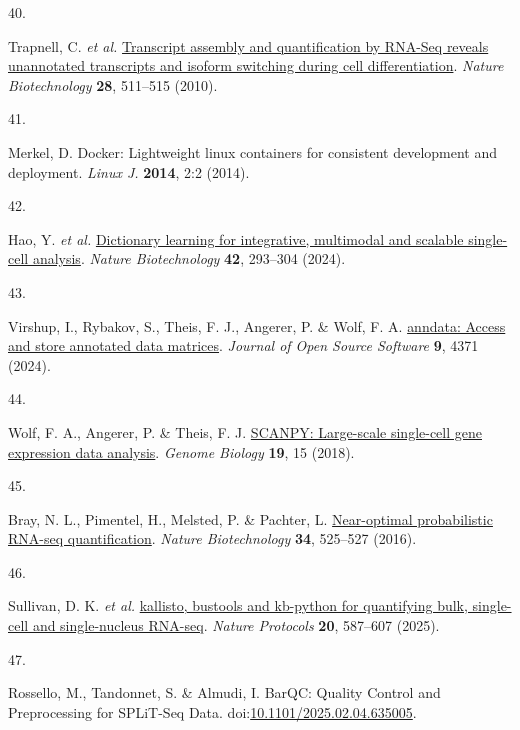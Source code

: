 \documentclass[
  11pt,
  a4paper,
]{report}
\newlength{\cslhangindent}
\newlength{\csllabelwidth}
\newenvironment{CSLReferences}[2] %
 {\begin{list}{}{%
  \setlength{\itemindent}{0pt}
  \setlength{\leftmargin}{0pt}
  \setlength{\parsep}{0pt}
  \ifodd #1
   \setlength{\leftmargin}{\cslhangindent}
   \setlength{\itemindent}{-1\cslhangindent}
  \fi
  \setlength{\itemsep}{#2\baselineskip}}}
 {\end{list}}
\newcommand{\CSLLeftMargin}[1]{\parbox[t]{\csllabelwidth}{\strut#1\strut}}
\newcommand{\CSLRightInline}[1]{\parbox[t]{\linewidth - \csllabelwidth}{\strut#1\strut}}
\begin{document}
\begin{CSLReferences}{0}{0}
\CSLLeftMargin{40. }%
\CSLRightInline{Trapnell, C. \emph{et al.}
\href{https://doi.org/10.1038/nbt.1621}{Transcript assembly and
quantification by RNA-Seq reveals unannotated transcripts and isoform
switching during cell differentiation}. \emph{Nature Biotechnology}
\textbf{28}, 511--515 (2010).}

\CSLLeftMargin{41. }%
\CSLRightInline{Merkel, D. Docker: Lightweight linux containers for
consistent development and deployment. \emph{Linux J.} \textbf{2014},
2:2 (2014).}

\CSLLeftMargin{42. }%
\CSLRightInline{Hao, Y. \emph{et al.}
\href{https://doi.org/10.1038/s41587-023-01767-y}{Dictionary learning
for integrative, multimodal and scalable single-cell analysis}.
\emph{Nature Biotechnology} \textbf{42}, 293--304 (2024).}

\CSLLeftMargin{43. }%
\CSLRightInline{Virshup, I., Rybakov, S., Theis, F. J., Angerer, P. \&
Wolf, F. A. \href{https://doi.org/10.21105/joss.04371}{anndata: Access
and store annotated data matrices}. \emph{Journal of Open Source
Software} \textbf{9}, 4371 (2024).}

\CSLLeftMargin{44. }%
\CSLRightInline{Wolf, F. A., Angerer, P. \& Theis, F. J.
\href{https://doi.org/10.1186/s13059-017-1382-0}{SCANPY: Large-scale
single-cell gene expression data analysis}. \emph{Genome Biology}
\textbf{19}, 15 (2018).}

\CSLLeftMargin{45. }%
\CSLRightInline{Bray, N. L., Pimentel, H., Melsted, P. \& Pachter, L.
\href{https://doi.org/10.1038/nbt.3519}{Near-optimal probabilistic
RNA-seq quantification}. \emph{Nature Biotechnology} \textbf{34},
525--527 (2016).}

\CSLLeftMargin{46. }%
\CSLRightInline{Sullivan, D. K. \emph{et al.}
\href{https://doi.org/10.1038/s41596-024-01057-0}{kallisto, bustools and
kb-python for quantifying bulk, single-cell and single-nucleus RNA-seq}.
\emph{Nature Protocols} \textbf{20}, 587--607 (2025).}

\CSLLeftMargin{47. }%
\CSLRightInline{Rossello, M., Tandonnet, S. \& Almudi, I. BarQC: Quality
Control and Preprocessing for SPLiT-Seq Data.
doi:\href{https://doi.org/10.1101/2025.02.04.635005}{10.1101/2025.02.04.635005}.}


\end{CSLReferences}
\end{document}
